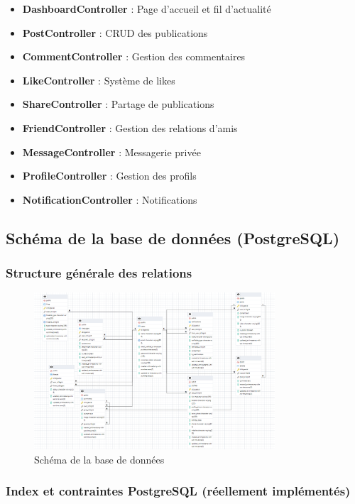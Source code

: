 \documentclass[12pt,a4paper]{article}
\begin{document}
\begin{itemize}
    \item \textbf{DashboardController} : Page d'accueil et fil d'actualit\'e
    \item \textbf{PostController} : CRUD des publications
    \item \textbf{CommentController} : Gestion des commentaires
    \item \textbf{LikeController} : Syst\`eme de likes
    \item \textbf{ShareController} : Partage de publications
    \item \textbf{FriendController} : Gestion des relations d'amis
    \item \textbf{MessageController} : Messagerie priv\'ee
    \item \textbf{ProfileController} : Gestion des profils
    \item \textbf{NotificationController} : Notifications
\end{itemize}

\subsection{Sch\'ema de la base de donn\'ees (PostgreSQL)}

\subsubsection{Structure g\'en\'erale des relations}

\begin{figure}[H]
    \centering
    \includegraphics[width=0.8\textwidth]{schema.png}
    \caption{Sch\'ema de la base de donn\'ees}
    \label{fig:database_schema}
\end{figure}

\subsubsection{Index et contraintes PostgreSQL (r\'eellement impl\'ement\'es)}
\end{document}
